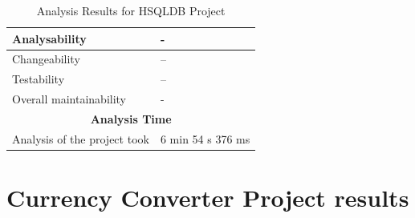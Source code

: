 \documentclass[11pt]{report}
\begin{document}
\begin{table}[H]
\begin{tabular}{|l|l|}
        \hline
        Analysability & - \\
        \hline
        Changeability & -- \\
        \hline
        Testability & -- \\
        \hline
        Overall maintainability & - \\
        \hline
        \multicolumn{2}{|c|}{\textbf{Analysis Time}} \\
        \hline
        Analysis of the project took & 6 min 54 s 376 ms \\
        \hline
    \end{tabular}
    \caption{Analysis Results for HSQLDB Project}
    \label{tab:analysis-results}
\end{table}

\section{Currency Converter Project results}
\label{sec:currency-converter}
\end{document}
